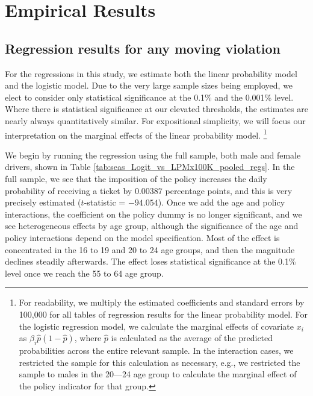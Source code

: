 \section{Empirical Results}
\label{sec:Empirical}


\subsection{Regression results for any moving violation}
\label{sec:Empirical_all}

For the regressions in this study, we estimate both the linear probability model and the logistic model. 
%
Due to the very large sample sizes being employed, 
we elect to consider only statistical significance at the 0.1\% and the 0.001\% level. 
%
Where there is statistical significance at our elevated thresholds, 
the estimates are nearly always quantitatively similar. 
For expositional simplicity, we will focus our interpretation on 
the marginal effects of the linear probability model.%
\footnote{%
For readability, we multiply the estimated coefficients and standard errors by 100,000 
for all tables of regression results for the linear probability model.
% 
For the logistic regression model, 
we calculate the marginal effects of covariate $x_i$ as 
$\beta_{i}\hat{p}(1-\hat{p})$, 
where $\hat{p}$ is calculated as 
the average of the predicted probabilities across the entire relevant sample. 
In the interaction cases, 
we restricted the sample for this calculation as necessary, 
e.g., we restricted the sample to males in the 20—24 age group 
to calculate the marginal effect of the policy indicator for that group. 
}






We begin by running the regression using the full sample, 
both male and female drivers, 
shown in 
Table \ref{tab:seas_Logit_vs_LPMx100K_pooled_regs}.
% 
In the full sample, we see that the imposition of the policy increases the daily probability 
of receiving a ticket by $0.00387$ percentage points, 
and this is very precisely estimated ($t$-statistic = $-94.054$). 
Once we add the age and policy interactions, 
the coefficient on the policy dummy is no longer significant, 
and we see heterogeneous effects by age group, 
% 
although the significance of the age and policy interactions
depend on the model specification. 
% 
Most of the effect is concentrated in the 16 to 19 and 20 to 24 age groups, 
and then the magnitude declines steadily afterwards. 
The effect loses statistical significance at the 0.1\% level once we reach the 55 to 64 age group.


